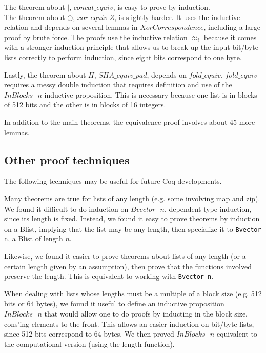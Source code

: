 \documentclass[twocolumn,showpacs,%
  nofootinbib,aps,superscriptaddress,%
  eqsecnum,prd,notitlepage,showkeys,10pt]{revtex4-1}
\newcommand{\s} {\textrm{ }}
\begin{document}
The theorem about $|$, $concat\_equiv$, is easy to prove by induction. \\
\indent
The theorem about $\oplus$, $xor\_equiv\_Z$, is slightly harder. It uses the inductive relation and depends on several lemmas in $XorCorrespondence$, including a large proof by brute force. The proofs use the inductive relation $\approx_i$ because it comes with a stronger induction principle that allows us to break up the input bit/byte lists correctly to perform induction, since eight bits correspond to one byte.
\indent

Lastly, the theorem about $H$, $SHA\_equiv\_pad$, depends on $fold\_equiv$. $fold\_equiv$ requires a messy double induction that requires definition and use of the $InBlocks \s n$ inductive proposition. This is necessary because one list is in blocks of 512 bits and the other is in blocks of 16 integers.

In addition to the main theorems, the equivalence proof involves about 45 more lemmas.

\subsection{Other proof techniques}

The following techniques may be useful for future Coq developments.

Many theorems are true for lists of any length (e.g. some involving map and zip). We found it difficult to do induction on $Bvector \s n$, dependent type induction, since its length is fixed. Instead, we found it easy to prove theorems by induction on a Blist, implying that the list may be any length, then specialize it to \verb|Bvector n|, a Blist of length $n$. 

Likewise, we found it easier to prove theorems about lists of any length (or a certain length given by an assumption), then prove that the functions involved preserve the length. This is equivalent to working with \verb|Bvector n|. %

When dealing with lists whose lengths must be a multiple of a block size (e.g. 512 bits or 64 bytes), we found it useful to define an inductive proposition $InBlocks \s n$ that would allow one to do proofs by inducting in the block size, cons'ing elements to the front. This allows an easier induction on bit/byte lists, since 512 bits correspond to 64 bytes. We then proved $InBlocks \s n$ equivalent to the computational version (using the length function). %
\end{document}
